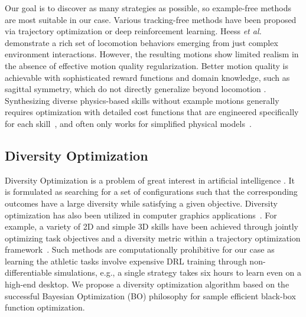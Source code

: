 Our goal is to discover as many strategies as possible, so example-free methods are most suitable in our case. Various tracking-free methods have been proposed via trajectory optimization or deep reinforcement learning. Heess \textit{et al.}  demonstrate a rich set of locomotion behaviors emerging from just complex environment interactions. However, the resulting motions show limited realism in the absence of effective motion quality regularization. Better motion quality is achievable with sophisticated reward functions and domain knowledge, such as sagittal symmetry, which do not directly generalize beyond locomotion \cite{Yu:2018:LSLL,coumans2016pybullet,Xie2020allsteps,mordatch2013-cio-locomotion,mordatch2015interactive}. Synthesizing diverse physics-based skills without example motions generally requires optimization with detailed cost functions that are engineered specifically for each skill~\cite{AlBorno13}, and often only works for simplified physical models~\cite{Mordatch12}.


\subsection{Diversity Optimization}
Diversity Optimization is a problem of great interest in artificial intelligence \cite{hebrard2005finding-diverse,ursem2002diversity,srivastava2007diverse-plan,coman2011generating-diverse,pugh2016quality-diversity,lehman2011novelty-search}. It is formulated as searching for a set of configurations such that the corresponding outcomes have a large diversity while satisfying a given objective. Diversity optimization has also been utilized in computer graphics applications~\cite{merrell2011interactive,Agrawal:2013:Diverse}. For example, a variety of 2D and simple 3D skills have been achieved through jointly optimizing task objectives and a diversity metric within 
a trajectory optimization framework~\cite{Agrawal:2013:Diverse}. Such methods are computationally prohibitive for our case as learning the athletic tasks involve expensive DRL training through non-differentiable simulations, e.g., a single strategy takes six hours to learn even on a high-end desktop. 
We propose a diversity optimization algorithm based on the successful Bayesian Optimization (BO) philosophy for sample efficient black-box function optimization.

